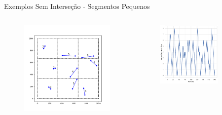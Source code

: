 \documentclass[aspectratio=169,usenames,dvipsnames]{beamer}
\begin{document}
\begin{frame}{Exemplos Sem Interseção - Segmentos Pequenos}
  \begin{columns}
    \begin{column}{0.35\textwidth}
      \begin{figure}
        \includegraphics[width=\textwidth]{figs/box_example.pdf}
      \end{figure}
    \end{column}
    \begin{column}{0.65\textwidth}
      \begin{figure}
        \includegraphics[width=0.8\textwidth]{figs/ativos/small_detection_segments_size_100.pdf}
      \end{figure}
    \end{column}
  \end{columns}
\end{frame}
\end{document}
